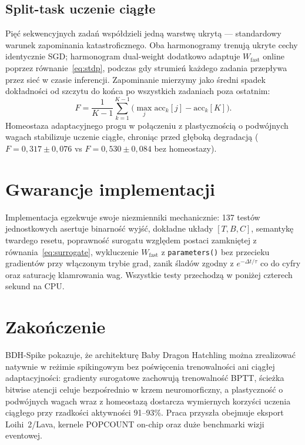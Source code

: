 \documentclass[11pt]{article}
\newcommand{\Wfast}{W_{\text{fast}}}
\begin{document}
\subsection{Split-task uczenie ciągłe}
Pięć sekwencyjnych zadań współdzieli jedną warstwę ukrytą --- standardowy
warunek zapominania katastroficznego. Oba harmonogramy trenują ukryte cechy
identycznie SGD; harmonogram dual-weight dodatkowo adaptuje $\Wfast$
online poprzez równanie~\eqref{eq:stdp}, podczas gdy strumień każdego
zadania przepływa przez sieć w czasie inferencji. Zapominanie mierzymy jako
średni spadek dokładności od szczytu do końca po wszystkich zadaniach poza
ostatnim:
\begin{equation}
F = \frac{1}{K-1}\sum_{k=1}^{K-1}
\Big(\max_j \mathrm{acc}_k[j] - \mathrm{acc}_k[K]\Big).
\end{equation}
Homeostaza adaptacyjnego progu w połączeniu z plastycznością o podwójnych wagach
stabilizuje uczenie ciągłe, chroniąc przed głęboką degradacją ($F = 0{,}317 \pm 0{,}076$ vs $F = 0{,}530 \pm 0{,}084$ bez homeostazy).

\section{Gwarancje implementacji}
Implementacja egzekwuje swoje niezmienniki mechanicznie: 137 testów
jednostkowych asertuje binarność wyjść, dokładne układy $[T,B,C]$,
semantykę twardego resetu, poprawność surogatu względem postaci zamkniętej
z równania~\eqref{eq:surrogate}, wykluczenie $\Wfast$ z
\texttt{parameters()} bez przecieku gradientów przy włączonym trybie grad,
zanik śladów zgodny z $e^{-\Delta t/\tau}$ co do cyfry oraz saturację
klamrowania wag. Wszystkie testy przechodzą w poniżej czterech sekund na CPU.

\section{Zakończenie}
BDH-Spike pokazuje, że architekturę Baby Dragon Hatchling można zrealizować
natywnie w reżimie spikingowym bez poświęcenia trenowalności ani ciągłej
adaptacyjności: gradienty surogatowe zachowują trenowalność BPTT, ścieżka
bitwise atencji celuje bezpośrednio w krzem neuromorficzny, a plastyczność o
podwójnych wagach wraz z homeostazą dostarcza wymiernych korzyści uczenia
ciągłego przy rzadkości aktywności 91--93\%. Praca przyszła obejmuje eksport
Loihi~2/Lava, kernele POPCOUNT on-chip oraz duże benchmarki wizji eventowej.
\end{document}
